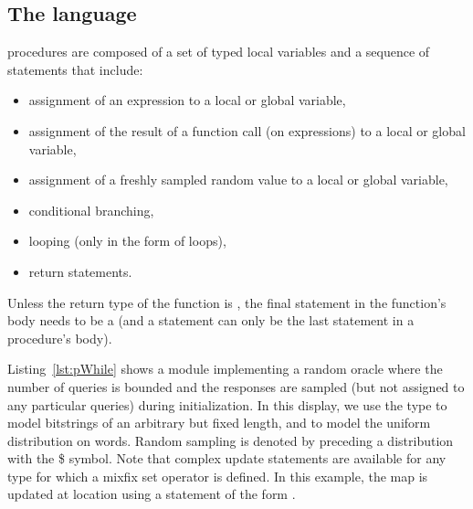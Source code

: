 \subsection{The \pWHILE language}
\pWHILE procedures are composed of a set of typed local variables and a
sequence of statements that include:
\begin{itemize}\itemsep-.5em
\item assignment of an expression to a local or global variable,
\item assignment of the result of a function call (on expressions) to a local
  or global variable,
\item assignment of a freshly sampled random value to a local or global
  variable,
\item conditional branching,
\item looping (only in the form of  loops),
\item return statements.
\end{itemize}
Unless the return type of the function is , the final statement in
the function's body needs to be a  (and a 
statement can only be the last statement in a procedure's body).

Listing~\ref{lst:pWhile} shows a module implementing a random oracle where the
number of queries is bounded and the responses are sampled (but not assigned to
any particular queries) during initialization. In this display, we use the type
 to model bitstrings of an arbitrary but fixed length, and
 to model the uniform distribution on words. Random sampling is
denoted by preceding a distribution with the \textsf{\$} symbol. Note that
complex update statements are available for any type for which a mixfix set
operator is defined. In this example, the map  is updated at location
 using a statement of the form .


